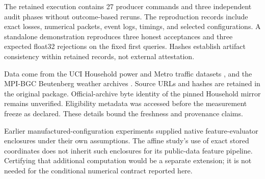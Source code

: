 The retained execution contains 27 producer commands and three independent audit phases without outcome-based reruns. The reproduction records include exact losses, numerical packets, event logs, timings, and selected configurations. A standalone demonstration reproduces three honest acceptances and three expected float32 rejections on the fixed first queries. Hashes establish artifact consistency within retained records, not external attestation.

Data come from the UCI Household power and Metro traffic datasets \citep{hebrail2006household,hogue2019metro}, and the MPI-BGC Beutenberg weather archives \citep{mpibgcweather}. Source URLs and hashes are retained in the original package. Official-archive byte identity of the pinned Household mirror remains unverified. Eligibility metadata was accessed before the measurement freeze as declared. These details bound the freshness and provenance claims.

Earlier manufactured-configuration experiments supplied native feature-evaluator enclosures under their own assumptions. The affine study's use of exact stored coordinates does not inherit such enclosures for its public-data feature pipeline. Certifying that additional computation would be a separate extension; it is not needed for the conditional numerical contract reported here.

